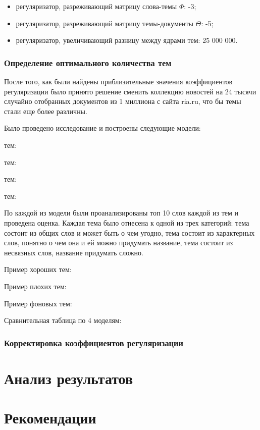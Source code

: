 \begin{itemize}
    \item регуляризатор, разреживающий матрицу слова-темы $\Phi$: -3;
    \item регуляризатор, разреживающий матрицу темы-документы $\Theta$: -5;
    \item регуляризатор, увеличивающий разницу между ядрами тем: 25 000 000.
\end{itemize}



\subsubsection{Определение оптимального количества тем}

После того, как были найдены приблизительные значения коэффициентов регуляризации было принято решение сменить коллекцию новостей на 24 тысячи случайно отобранных документов из 1 миллиона с сайта ria.ru, что бы темы стали еще более различны.

Было проведено исследование и построены следующие модели:

 тем:

 тем:

 тем:

 тем:

По каждой из модели были проанализированы топ 10 слов каждой из тем и проведена оценка. Каждая тема было отнесена к одной из трех категорий: тема состоит из общих слов и может быть о чем угодно, тема состоит из характерных слов, понятно о чем она и ей можно придумать название, тема состоит из несвязных слов, название придумать сложно.

Пример хороших тем:

Пример плохих тем:

Пример фоновых тем:

Сравнительная таблица по 4 моделям:

\subsubsection{Корректировка коэффициентов регуляризации}


%
\section{Анализ результатов}

\todo[inline]{}

%
\section{Рекомендации}
